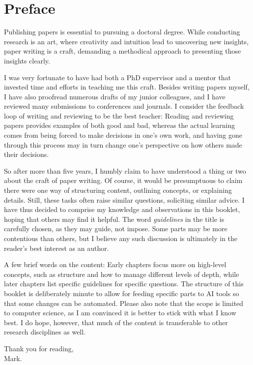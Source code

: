 \chapter*{Preface}

Publishing papers is essential to pursuing a doctoral degree.
While conducting research is an art, where creativity and intuition lead to uncovering new insights, paper writing is a craft, demanding a methodical approach to presenting those insights clearly.

I was very fortunate to have had both a PhD supervisor and a mentor that invested time and efforts in teaching me this craft.
Besides writing papers myself, I have also proofread numerous drafts of my junior colleagues, and I have reviewed many submissions to conferences and journals. %
I consider the feedback loop of writing and reviewing to be the best teacher:
Reading and reviewing papers provides examples of both good and bad, whereas the actual learning comes from being forced to make decisions in one's own work, and having gone through this process may in turn change one's perspective on how others made their decisions.

So after more than five years, I humbly claim to have understood a thing or two about the craft of paper writing.
Of course, it would be presumptuous to claim there were one way of structuring content, outlining concepts, or explaining details.
Still, these tasks often raise similar questions, soliciting similar advice.
I have thus decided to comprise my knowledge and observations in this booklet, hoping that others may find it helpful.
The word \emph{guidelines} in the title is carefully chosen, as they may guide, not impose.
Some parts may be more contentious than others, but I believe any such discussion is ultimately in the reader's best interest as an author.

A few brief words on the content:
Early chapters focus more on high-level concepts, such as structure and how to manage different levels of depth, while later chapters list specific guidelines for specific questions.
The structure of this booklet is deliberately minute to allow for feeding specific parts to AI tools so that some changes can be automated.
Please also note that the scope is limited to computer science, as I am convinced it is better to stick with what I know best.
I do hope, however, that much of the content is transferable to other research disciplines as well.

\bigskip

\noindent Thank you for reading, \\
\noindent Mark.
